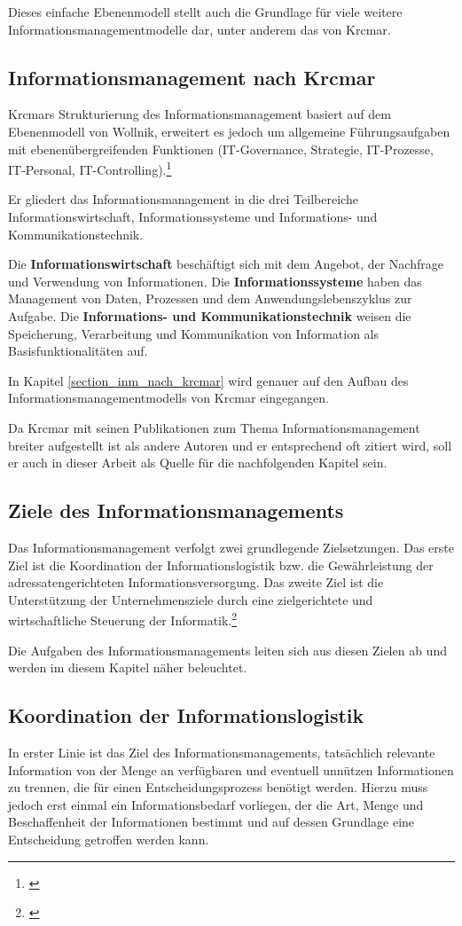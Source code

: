 Dieses einfache Ebenenmodell stellt auch die Grundlage für viele weitere Informationsmanagementmodelle dar, unter anderem das von Krcmar.

\subsection{Informationsmanagement nach Krcmar}
Krcmars Strukturierung des Informationsmanagement basiert auf dem Ebenenmodell von Wollnik, erweitert es jedoch um allgemeine Führungsaufgaben mit ebenenübergreifenden Funktionen (IT-Governance, Strategie, IT-Prozesse, IT-Personal, IT-Controlling).\footnote{\cite{krcmar_informationsmanagement_2015}}

Er gliedert das Informationsmanagement in die drei Teilbereiche Informationswirtschaft, Informationssysteme und Informations- und Kommunikationstechnik.

Die \textbf{Informationswirtschaft} beschäftigt sich mit dem Angebot, der Nachfrage und Verwendung von Informationen.
Die \textbf{Informationssysteme} haben das Management von Daten, Prozessen und dem Anwendungslebenszyklus zur Aufgabe.
Die \textbf{Informations- und Kommunikationstechnik} weisen die Speicherung, Verarbeitung und Kommunikation von Information als Basisfunktionalitäten auf.

In Kapitel \ref{section_inm_nach_krcmar} wird genauer auf den Aufbau des Informationsmanagementmodells von Krcmar eingegangen.

Da Krcmar mit seinen Publikationen zum Thema Informationsmanagement breiter aufgestellt ist als andere Autoren und er entsprechend oft zitiert wird, soll er auch in dieser Arbeit als Quelle für die nachfolgenden Kapitel sein. 

\subsection{Ziele des Informationsmanagements}
Das Informationsmanagement verfolgt zwei grundlegende Zielsetzungen.
Das erste Ziel ist die Koordination der Informationslogistik bzw. die Gewährleistung der adressatengerichteten Informationsversorgung.
Das zweite Ziel ist die Unterstützung der Unternehmensziele durch eine zielgerichtete und wirtschaftliche Steuerung der Informatik.\footnote{\cite{zarnekow_intergriertes_2004}}

Die Aufgaben des Informationsmanagements leiten sich aus diesen Zielen ab und werden im diesem Kapitel näher beleuchtet.

\subsection{Koordination der Informationslogistik}
In erster Linie ist das Ziel des Informationsmanagements, tatsächlich relevante Information von der Menge an verfügbaren und eventuell unnützen Informationen zu trennen, die für einen Entscheidungsprozess benötigt werden. Hierzu muss jedoch erst einmal ein Informationsbedarf vorliegen, der die Art, Menge und Beschaffenheit der Informationen bestimmt und auf dessen Grundlage eine Entscheidung getroffen werden kann.

